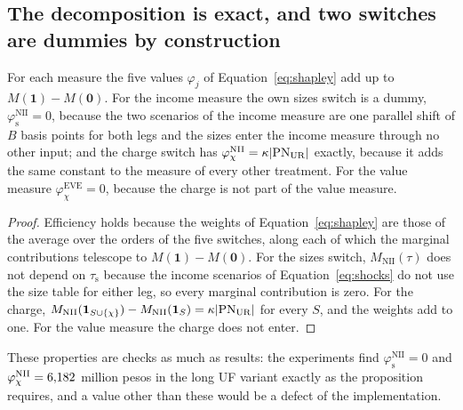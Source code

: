 \subsection{The decomposition is exact, and two switches are dummies by construction}
\label{sec:theory-shapley}

\begin{proposition}
\label{prop:shapley}
For each measure the five values $\varphi_j$ of Equation~\eqref{eq:shapley} add up to $M(\mathbf 1)-M(\mathbf 0)$. For the income measure the own sizes switch is a dummy, $\varphi_{\mathrm s}^{\mathrm{NII}}=0$, because the two scenarios of the income measure are one parallel shift of $B$ basis points for both legs and the sizes enter the income measure through no other input; and the charge switch has $\varphi_{\chi}^{\mathrm{NII}}=\kappa|\mathrm{PN}_{\mathrm{UR}}|$ exactly, because it adds the same constant to the measure of every other treatment. For the value measure $\varphi_\chi^{\mathrm{EVE}}=0$, because the charge is not part of the value measure.
\end{proposition}
\begin{proof}
Efficiency holds because the weights of Equation~\eqref{eq:shapley} are those of the average over the orders of the five switches, along each of which the marginal contributions telescope to $M(\mathbf 1)-M(\mathbf 0)$. For the sizes switch, $M_{\mathrm{NII}}(\tau)$ does not depend on $\tau_{\mathrm s}$ because the income scenarios of Equation~\eqref{eq:shocks} do not use the size table for either leg, so every marginal contribution is zero. For the charge, $M_{\mathrm{NII}}(\mathbf 1_{S\cup\{\chi\}})-M_{\mathrm{NII}}(\mathbf 1_S)=\kappa|\mathrm{PN}_{\mathrm{UR}}|$ for every $S$, and the weights add to one. For the value measure the charge does not enter.
\end{proof}

These properties are checks as much as results: the experiments find $\varphi_{\mathrm s}^{\mathrm{NII}}=0$ and $\varphi_\chi^{\mathrm{NII}}=6{,}182{}$ million pesos in the long UF variant exactly as the proposition requires, and a value other than these would be a defect of the implementation.
